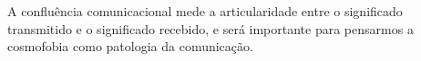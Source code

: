 A confluência comunicacional mede a articularidade entre o significado transmitido e o significado recebido, e será importante para pensarmos a cosmofobia como patologia da comunicação.